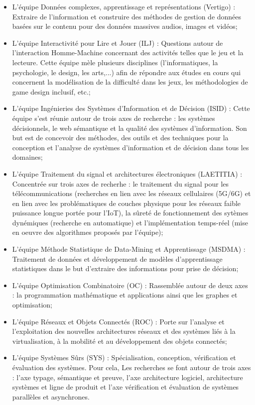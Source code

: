 \documentclass[11pt]{article}
\begin{document}
	\begin{itemize}
		\item L'équipe Données complexes, apprentissage et représentations (Vertigo) : Extraire de l'information et construire des méthodes de gestion de données basées sur le contenu pour des données massives audios, images et vidéos;
		\item L'équipe Interactivité pour Lire et Jouer (ILJ) : Questions autour de l'interaction Homme-Machine concernant des activités telles que le jeu et la lecteure. Cette équipe mèle plusieurs disciplines (l'informatiques, la psychologie, le design, les arts,...) afin de répondre aux études en cours qui concernent la modélisation de la difficulté dans les jeux, les méthodologies de game design inclusif, etc.;
		\item L'équipe Ingénieries des Systèmes d'Information et de Décision (ISID) : Cette équipe s'est réunie autour de trois axes de recherche : les systèmes décisionnels, le web sémantique et la qualité des systèmes d'information. Son but est de concevoir des méthodes, des outils et des techniques	pour la conception et l'analyse de systèmes d'information et de décision dans tous les domaines;
		\item L'équipe Traitement du signal et architectures électroniques (LAETITIA) : Concentrée sur trois axes de recherhe : le traitement du signal pour les télécommunications (recherches en lien avec les réseaux cellulaires (5G/6G) et en lien avec les problématiques de couches physique pour les réseaux faible puissance longue portée pour l'IoT), la sûreté de fonctionnement des sytèmes dynémiques (recherche en automatique) et l'implémentation temps-réel (mise en oeuvre des algorithmes proposés par l'équipe);
		\item L'équipe Méthode Statistique de Data-Mining et Apprentissage (MSDMA) : Traitement de données et développement de modèles d'apprentissage statistiques dans le but d'extraire des informations pour prise de décision;
		\item L'équipe Optimisation Combinatoire (OC) : Rassemblée autour de deux axes : la programmation mathématique et applications ainsi que les graphes et optimisation;
		\item L'équipe Réseaux et Objets Connectés (ROC) : Porte sur l'analyse et l'exploitation des nouvelles architectures réseaux et des systèmes liés à la virtualisation, à la mobilité et au développement des objets connectés;
		\item L'équipe Systèmes Sûrs (SYS) : Spécialisation, conception, vérification et évaluation des systèmes. Pour cela, Les recherches se font autour de trois axes : l'axe typage, sémantique et preuve, l'axe architecture logiciel, architecture systèmes et ligne de produit et l'axe vérification et évaluation de systèmes parallèles et asynchrones.
	\end{itemize}
\end{document}
